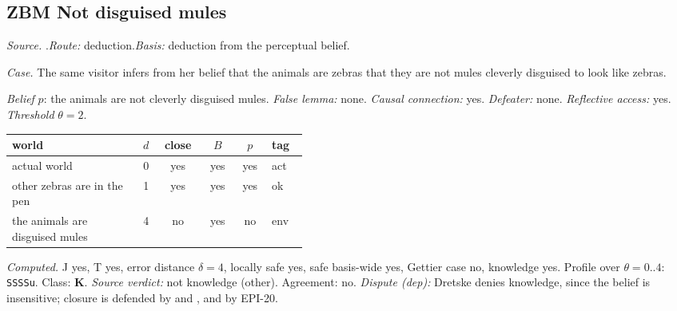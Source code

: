 \subsection*{ZBM \enspace Not disguised mules}
\noindent\textit{Source.} \citet{Dretske1970}.\quad \textit{Route:} deduction.\quad \textit{Basis:} deduction from the perceptual belief.\par
\noindent\textit{Case.} The same visitor infers from her belief that the animals are zebras that they are not mules cleverly disguised to look like zebras.\par
\noindent\textit{Belief} $p$: the animals are not cleverly disguised mules.
 \textit{False lemma:} none. \textit{Causal connection:} yes. \textit{Defeater:} none. \textit{Reflective access:} yes. \textit{Threshold} $\theta = 2$.\par
\begin{center}\begin{tabular}{@{}p{0.43\linewidth}rcccl@{}}
world & $d$ & close & $B$ & $p$ & tag \\ \midrule
actual world & 0 & yes & yes & yes & act \\
other zebras are in the pen & 1 & yes & yes & yes & ok \\
the animals are disguised mules & 4 & no & yes & no & env \\
\end{tabular}\end{center}
\noindent\textit{Computed.} J yes, T yes, error distance $\delta = 4$, locally safe yes, safe basis-wide yes, Gettier case no, knowledge yes. Profile over $\theta = 0..4$: \texttt{SSSSu}. Class: \textbf{K}.
 \textit{Source verdict:} not knowledge (other). Agreement: no.
 \textit{Dispute (dep):} Dretske denies knowledge, since the belief is insensitive; closure is defended by \citet{Williamson2000} and \citet{Hawthorne2004}, and by EPI-20.
\par\medskip
{}
